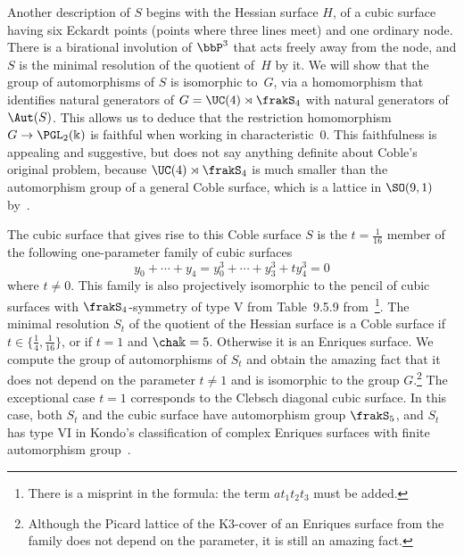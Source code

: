 Another description of $S$ begins with the Hessian surface $H$, of a cubic surface having six Eckardt points (points where three lines meet) and one ordinary node. There is a birational involution of $\bbP^3$ that acts freely away from the node, and $S$ is the minimal resolution of the quotient of~$H$ by it. We will show that the group of automorphisms of $S$ is isomorphic to~$G$, via a homomorphism that identifies natural generators of $G = \UC(4)\rtimes \frakS_4$ with natural generators of $\Aut(S)$. This allows us to deduce that the restriction homomorphism $G\to\PGL_2(\Bbbk)$ is faithful when working in characteristic~$0$. This faithfulness is appealing and suggestive, but does not say anything definite about Coble's original problem, because $\UC(4)\rtimes\frakS_4$ is much smaller than the automorphism group of a general Coble surface, which is a lattice in $\SO(9,1)$ by~\cite[Theorem~2.10.1]{CossecDolgachev}.

The cubic surface that gives rise to this Coble surface $S$ is the $t=\frac1{16}$ member of the following one-parameter family of cubic surfaces
\begin{equation*}
y_0+\cdots+y_4=y_0^3+\cdots+y_3^3+ty_4^3=0
\end{equation*}
where $t\neq0$. This family is also projectively isomorphic to the pencil of cubic surfaces with $\frakS_4$-symmetry of type V from Table~9.5.9 from~\cite{CAG}\footnote{There is a misprint in the formula: the term $at_1t_2t_3$ must be added.}\!. %
The minimal resolution $S_t$ of the quotient of the Hessian surface is a Coble surface if $t\in\{\frac{1}{4}, \frac{1}{16}\}$, or if $t=1$ and $\cha\Bbbk=5$. Otherwise it is an Enriques surface. We compute the group of automorphisms of $S_t$ and obtain the amazing fact that it does not depend on the parameter $t\ne 1$ and is isomorphic to the group $G$.\footnote{Although the Picard lattice of the K3-cover of an Enriques surface from the family does not depend on the parameter, it is still an amazing fact.} The exceptional case $t = 1$ corresponds to the Clebsch diagonal cubic surface. In this case, both $S_t$ and the cubic surface have automorphism group $\frakS_5$, and $S_t$ has type VI in Kondo's classification of complex Enriques surfaces with finite automorphism group~\cite{Kondo}.

